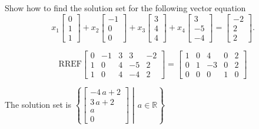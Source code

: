 
\begin{exerciseStatement}


Show how to find the solution set for the following vector equation \[ x_{1} \left[\begin{array}{c}
0 \\
1 \\
1
\end{array}\right] + x_{2} \left[\begin{array}{c}
-1 \\
0 \\
0
\end{array}\right] + x_{3} \left[\begin{array}{c}
3 \\
4 \\
4
\end{array}\right] + x_{4} \left[\begin{array}{c}
3 \\
-5 \\
-4
\end{array}\right] = \left[\begin{array}{c}
-2 \\
2 \\
2
\end{array}\right] .\]


\end{exerciseStatement}
    
\begin{exerciseAnswer} 
\[\mathrm{RREF} \left[\begin{array}{cccc|c}
0 & -1 & 3 & 3 & -2 \\
1 & 0 & 4 & -5 & 2 \\
1 & 0 & 4 & -4 & 2
\end{array}\right]  =  \left[\begin{array}{cccc|c}
1 & 0 & 4 & 0 & 2 \\
0 & 1 & -3 & 0 & 2 \\
0 & 0 & 0 & 1 & 0
\end{array}\right] \]

The solution set is \( \left\{ \left[\begin{array}{c}
-4 \, a + 2 \\
3 \, a + 2 \\
a \\
0
\end{array}\right] \middle|\,a\in\mathbb{R}\right\} \)


\end{exerciseAnswer}
    
